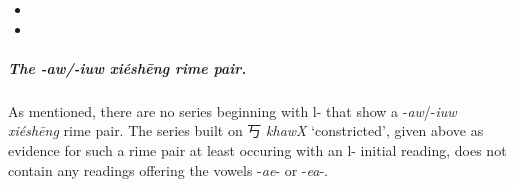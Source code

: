 \begin{itemize}
\begin{itemize}[noitemsep]

\vspace{-1mm}

\end{itemize}

  \item {} %




  \item {} %

\vspace{-3mm}


\begin{itemize}[noitemsep]

\end{itemize}
\end{itemize}


\subparagraph{The -\textit{aw}/-\textit{iuw} \textit{xiéshēng} rime pair.}
\label{subpar:aw-iuw-XS-pair}
As mentioned, there are no series beginning with l- that show a -\textit{aw}/-\textit{iuw} \textit{xiéshēng} rime pair. The series built on
丂 \textit{khawX} `constricted', given above as evidence for such a rime pair at least occuring with an l- initial reading, does not contain any readings offering the vowels -\textit{ae}- or -\textit{ea}-.  

